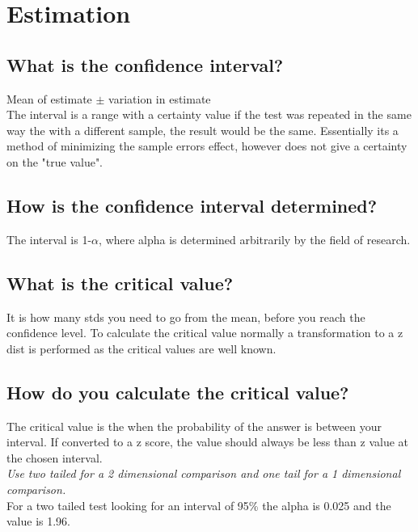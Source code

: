 \documentclass[11pt]{scrartcl} %
\begin{document}
\section{Estimation}

\subsection{What is the confidence interval?}

Mean of estimate \(\pm\) variation in estimate \\

The interval is a range with a certainty value if the test was repeated in the same way the with a different sample,
the result would be the same. Essentially its a method of minimizing the sample errors effect, however does not give
a certainty on the "true value". 

\subsection{How is the confidence interval determined?}

The interval is 1-\(\alpha\), where alpha is determined arbitrarily by the field of research.

\subsection{What is the critical value?}

It is how many stds you need to go from the mean, before you reach the confidence level. To calculate the critical value
normally a transformation to a z dist is performed as the critical values are well known.

\subsection{How do you calculate the critical value?}

The critical value is the when the probability of the answer is between your interval. If converted to a z score, the
value should always be less than z value at the chosen interval.\\

\textit{Use two tailed for a 2 dimensional comparison and one tail for a 1 dimensional comparison.}\\

For a two tailed test looking for an interval of 95\% the alpha is 0.025 and the value is 1.96.
\end{document}
